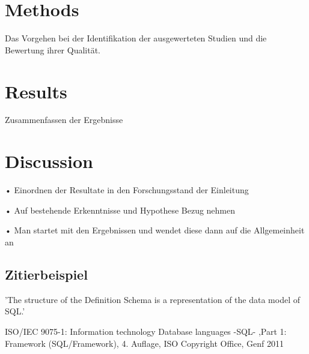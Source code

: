 \documentclass[12pt,twocolumn,twoside]{conference}   %
\begin{document}
\section{Methods}
\begin{list}{•}
\item Das Vorgehen bei der Identifikation der ausgewerteten Studien und die Bewertung ihrer Qualität.
\end{list}


\section{Results}
\begin{list}{•}
\item Zusammenfassen der Ergebnisse
\end{list}


\section{Discussion}
\begin{list}{•}
\item[•] Einordnen der Resultate in den Forschungsstand der Einleitung
\item[•] Auf bestehende Erkenntnisse und Hypothese Bezug nehmen
\item[•] Man startet mit den Ergebnissen und wendet diese dann auf die Allgemeinheit an
\end{list}


\subsection{Zitierbeispiel}
'The structure of the Definition Schema is a representation of the data model of SQL.' \cite{ISO9075-1:2011}


\newpage

\begin{thebibliography}{99}
	
	ISO/IEC 9075-1: Information technology
	Database languages -SQL- ,Part 1: Framework
	(SQL/Framework), 4. Auflage, ISO Copyright Office,
	Genf 2011
	
	
\end{thebibliography}
\end{document}
